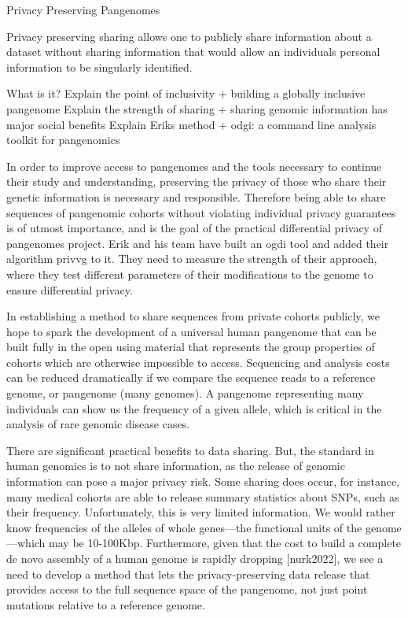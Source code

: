 Privacy Preserving Pangenomes

Privacy preserving sharing allows one to publicly share information about a dataset without sharing information that would allow an individuals personal information to be singularly identified.


What is it?
Explain the point of inclusivity
    + building a globally inclusive pangenome
Explain the strength of sharing
    + sharing genomic information has major social benefits
Explain Eriks method
    + odgi: a command line analysis toolkit for pangenomics

In order to improve access to pangenomes and the tools necessary to continue their study and understanding, preserving the privacy of those who share their genetic information is necessary and responsible.
Therefore being able to share sequences of pangenomic cohorts without violating individual privacy guarantees is of utmost importance, and is the goal of the practical differential privacy of pangenomes project.
Erik and his team have built an ogdi tool and added their algorithm privvg to it.
They need to measure the strength of their approach, where they test different parameters of their modifications to the genome to ensure differential privacy.

In establishing a method to share sequences from private cohorts publicly, we hope to spark the development of a universal human pangenome that can be built fully in the open using material that represents the group properties of cohorts which are otherwise impossible to access.
Sequencing and analysis costs can be reduced dramatically if we compare the sequence reads to a reference genome, or pangenome (many genomes). A pangenome representing many individuals can show us the frequency of a given allele, which is critical in the analysis of rare genomic disease cases.

There are significant practical benefits to data sharing. But, the standard in human genomics is to not share information, as the release of genomic information can pose a major privacy risk. Some sharing does occur, for instance, many medical cohorts are able to release summary statistics about SNPs, such as their frequency. Unfortunately, this is very limited information. We would rather know frequencies of the alleles of whole genes—the functional units of the genome—which may be 10-100Kbp. Furthermore, given that the cost to build a complete de novo assembly of a human genome is rapidly dropping [nurk2022], we see a need to develop a method that lets the privacy-preserving data release that provides access to the full sequence space of the pangenome, not just point mutations relative to a reference genome.

